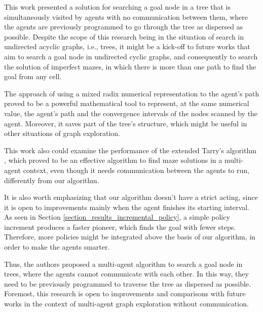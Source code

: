 This work presented a solution for searching a goal node in a tree that is simultaneously visited by agents with no communication between them, where the agents are previously programmed to go through the tree as dispersed as possible. Despite the scope of this research being in the situation of search in undirected acyclic graphs, i.e., trees, it might be a kick-off to future works that aim to search a goal node in undirected cyclic graphs, and consequently to search the solution of imperfect mazes, in which there is more than one path to find the goal from any cell.

The approach of using a mixed radix numerical representation to the agent's path proved to be a powerful mathematical tool to represent, at the same numerical value, the agent's path and the convergence intervals of the nodes scanned by the agent. Moreover, it saves part of the tree's structure, which might be useful in other situations of graph exploration.

This work also could examine the performance of the extended Tarry's algorithm \cite{KivelevitchCohen2010}, which proved to be an effective algorithm to find maze solutions in a multi-agent context, even though it needs communication between the agents to run, differently from our algorithm.

It is also worth emphasizing that our algorithm doesn't have a strict acting, since it is open to improvements mainly when the agent finishes its starting interval. As seen in Section \ref{section_results_incremental_policy}, a simple policy increment produces a faster pioneer, which finds the goal with fewer steps. Therefore, more policies might be integrated above the basis of our algorithm, in order to make the agents smarter.

Thus, the authors proposed a multi-agent algorithm to search a goal node in trees, where the agents cannot communicate with each other. In this way, they need to be previously programmed to traverse the tree as dispersed as possible. Foremost, this research is open to improvements and comparisons with future works in the context of multi-agent graph exploration without communication.